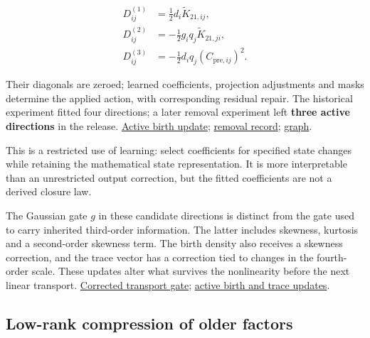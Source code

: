 \documentclass[11pt,letterpaper]{article}
\begin{document}
\begin{equation}
\begin{aligned}
D^{(1)}_{ij}&=\tfrac12d_i\widetilde K_{21,ij},\\
D^{(2)}_{ij}&=-\tfrac12g_iq_j\widetilde K_{21,ji},\\
D^{(3)}_{ij}&=-\tfrac12d_iq_j(C_{\mathrm{pre},ij})^2.
\end{aligned}
\end{equation}

Their diagonals are zeroed; learned coefficients, projection adjustments and masks determine the applied action, with corresponding residual repair. The historical experiment fitted four directions; a later removal experiment left \textbf{three active directions} in the release. \href{https://github.com/mattliston/arc-whitebox-estimation-challenge/blob/main/submissions/337641/estimator.py\#L22797}{Active birth update}; \href{https://github.com/mattliston/arc-whitebox-estimation-challenge/tree/main/experiments/birth-terms/fourth-birth-direction-leg-removal-saves-0-091-work/}{removal record}; \href{https://mattliston.github.io/arc-whitebox-estimation-challenge/\#node=dev-fitted-births&view=map}{graph}.

This is a restricted use of learning: select coefficients for specified state changes while retaining the mathematical state representation. It is more interpretable than an unrestricted output correction, but the fitted coefficients are not a derived closure law.

The Gaussian gate \(g\) in these candidate directions is distinct from the gate used to carry inherited third-order information. The latter includes skewness, kurtosis and a second-order skewness term. The birth density also receives a skewness correction, and the trace vector has a correction tied to changes in the fourth-order scale. These updates alter what survives the nonlinearity before the next linear transport. \href{https://github.com/mattliston/arc-whitebox-estimation-challenge/blob/main/submissions/337641/estimator.py\#L24003}{Corrected transport gate}; \href{https://github.com/mattliston/arc-whitebox-estimation-challenge/blob/main/submissions/337641/estimator.py\#L24838}{active birth and trace updates}.

\subsection{Low-rank compression of older factors}\label{low-rank-compression-of-older-factors}
\end{document}
